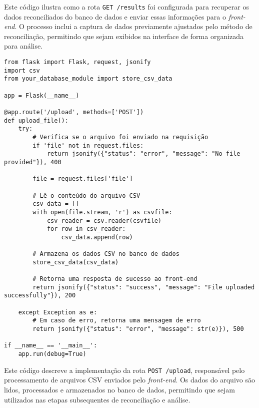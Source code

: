 Este código ilustra como a rota \texttt{GET /results} foi configurada para recuperar os dados reconciliados do banco de dados e enviar essas informações para o \textit{front-end}. O processo inclui a captura de dados previamente ajustados pelo método de reconciliação, permitindo que sejam exibidos na interface de forma organizada para análise.

\label{Anexo:CodigoRouteUpload}

\begin{verbatim}
from flask import Flask, request, jsonify
import csv
from your_database_module import store_csv_data

app = Flask(__name__)

@app.route('/upload', methods=['POST'])
def upload_file():
    try:
        # Verifica se o arquivo foi enviado na requisição
        if 'file' not in request.files:
            return jsonify({"status": "error", "message": "No file provided"}), 400

        file = request.files['file']
        
        # Lê o conteúdo do arquivo CSV
        csv_data = []
        with open(file.stream, 'r') as csvfile:
            csv_reader = csv.reader(csvfile)
            for row in csv_reader:
                csv_data.append(row)

        # Armazena os dados CSV no banco de dados
        store_csv_data(csv_data)

        # Retorna uma resposta de sucesso ao front-end
        return jsonify({"status": "success", "message": "File uploaded successfully"}), 200

    except Exception as e:
        # Em caso de erro, retorna uma mensagem de erro
        return jsonify({"status": "error", "message": str(e)}), 500

if __name__ == '__main__':
    app.run(debug=True)
\end{verbatim}

Este código descreve a implementação da rota \texttt{POST /upload}, responsável pelo processamento de arquivos CSV enviados pelo \textit{front-end}. Os dados do arquivo são lidos, processados e armazenados no banco de dados, permitindo que sejam utilizados nas etapas subsequentes de reconciliação e análise.

\label{Anexo:CodigoValidacaoDados}


